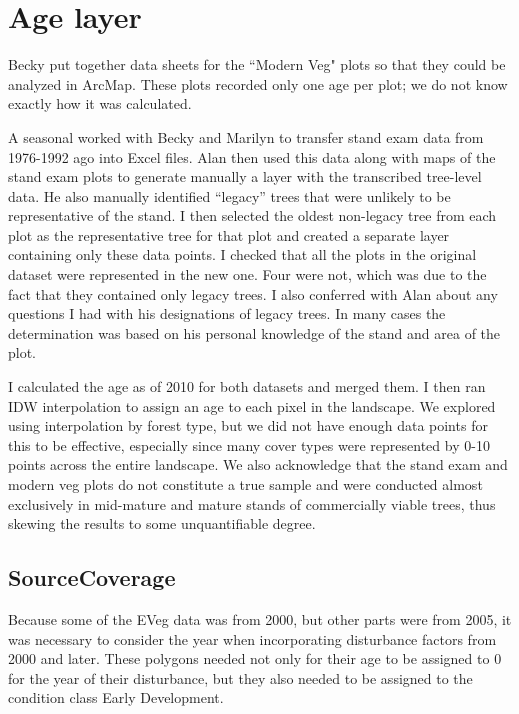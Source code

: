 \section{Age layer}
Becky put together data sheets for the ``Modern Veg" plots so that they could be analyzed in ArcMap. These plots recorded only one age per plot; we do not know exactly how it was calculated. 

A seasonal worked with Becky and Marilyn to transfer stand exam data from 1976-1992 ago into Excel files. Alan then used this data along with maps of the stand exam plots to generate manually a layer with the transcribed tree-level data. He also manually identified ``legacy'' trees that were unlikely to be representative of the stand. I then selected the oldest non-legacy tree from each plot as the representative tree for that plot and created a separate layer containing only these data points. I checked that all the plots in the original dataset were represented in the new one. Four were not, which was due to the fact that they contained only legacy trees. I also conferred with Alan about any questions I had with his designations of legacy trees. In many cases the determination was based on his personal knowledge of the stand and area of the plot.

I calculated the age as of 2010 for both datasets and merged them. I then ran IDW interpolation to assign an age to each pixel in the landscape. We explored using interpolation by forest type, but we did not have enough data points for this to be effective, especially since many cover types were represented by 0-10 points across the entire landscape. We also acknowledge that the stand exam and modern veg plots do not constitute a true sample and were conducted almost exclusively in mid-mature and mature stands of commercially viable trees, thus skewing the results to some unquantifiable degree.

\subsection{SourceCoverage} Because some of the EVeg data was from 2000, but other parts were from 2005, it was necessary to consider the year when incorporating disturbance factors from 2000 and later. These polygons needed not only for their age to be assigned to 0 for the year of their disturbance, but they also needed to be assigned to the condition class Early Development.


